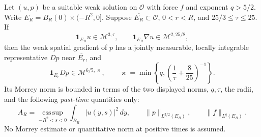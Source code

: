 \documentclass[11pt,reqno]{amsart}
\begin{document}
\begin{lemma}\label{lem:pressure-gradient-past}
Let $(u,p)$ be a suitable weak solution on $\mathcal O$ with force $f$
and exponent $q>5/2$. Write $E_R=B_R(0)\times(-R^2,0]$. Suppose
$\overline{E_R}\subset\mathcal O$, $0<r<R$, and $25/3\le\tau\le25$.
If
\[
 \mathbf1_{E_R}u\in\mathcal M^{3,\tau},\qquad
 \mathbf1_{E_R}\nabla u\in\mathcal M^{2,25/8},
\]
then the weak spatial gradient of $p$ has a jointly measurable,
locally integrable representative $Dp$ near $\overline{E_r}$, and
\[
 \mathbf1_{E_r}Dp\in\mathcal M^{6/5,\varkappa},\qquad
 \varkappa=\min\left\{q,\left(\frac1\tau+\frac8{25}\right)^{-1}\right\}.
\]
Its Morrey norm is bounded in terms of the two displayed norms, $q,\tau$,
the radii, and the following \emph{past-time} quantities only:
\[
 A_R=\operatorname*{ess\,sup}_{-R^2<s<0}
           \int_{B_R}|u(y,s)|^2\,dy,\qquad
 \|p\|_{L^{3/2}(E_R)},\qquad \|f\|_{L^q(E_R)}.
\]
No Morrey estimate or quantitative norm at positive times is assumed.
\end{lemma}
\end{document}
